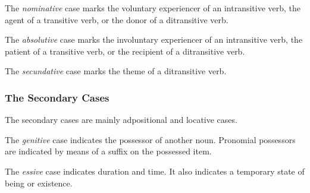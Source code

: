 \documentclass[grammar]{subfiles}
\begin{document}

  The \emph{nominative} case marks the voluntary experiencer of an intransitive verb, the agent of a transitive verb, or the donor of a ditransitive verb.


  The \emph{absolutive} case marks the involuntary experiencer of an intransitive verb, the patient of a transitive verb, or the recipient of a ditransitive verb.


  The \emph{secundative} case marks the theme of a ditransitive verb.

  \subsubsection{The Secondary Cases}
  \label{sssec:nm_secondary_cases}

  The secondary cases are mainly adpositional and locative cases.


  The \emph{genitive} case indicates the possessor of another noun. Pronomial possessors are indicated by means of a suffix on the possessed item.


  The \emph{essive} case indicates duration and time. It also indicates a temporary state of being or existence.

\end{document}
